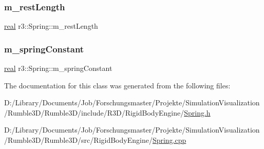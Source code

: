 \mbox{\label{classr3_1_1_spring_ad1c8ba98c782bee7f9896d0c868b9ee7}} 
\subsubsection{\texorpdfstring{m\+\_\+rest\+Length}{m\_restLength}}
{\footnotesize\ttfamily \mbox{\hyperlink{namespacer3_ab2016b3e3f743fb735afce242f0dc1eb}{real}} r3\+::\+Spring\+::m\+\_\+rest\+Length\hspace{0.3cm}{\ttfamily [protected]}}

\mbox{\label{classr3_1_1_spring_a06963e33fd2c3f8e25ddd345324b292b}} 
\subsubsection{\texorpdfstring{m\+\_\+spring\+Constant}{m\_springConstant}}
{\footnotesize\ttfamily \mbox{\hyperlink{namespacer3_ab2016b3e3f743fb735afce242f0dc1eb}{real}} r3\+::\+Spring\+::m\+\_\+spring\+Constant\hspace{0.3cm}{\ttfamily [protected]}}



The documentation for this class was generated from the following files\+:\begin{DoxyCompactItemize}
\item 
D\+:/\+Library/\+Documents/\+Job/\+Forschungsmaster/\+Projekte/\+Simulation\+Visualization/\+Rumble3\+D/\+Rumble3\+D/include/\+R3\+D/\+Rigid\+Body\+Engine/\mbox{\hyperlink{_spring_8h}{Spring.\+h}}\item 
D\+:/\+Library/\+Documents/\+Job/\+Forschungsmaster/\+Projekte/\+Simulation\+Visualization/\+Rumble3\+D/\+Rumble3\+D/src/\+Rigid\+Body\+Engine/\mbox{\hyperlink{_spring_8cpp}{Spring.\+cpp}}\end{DoxyCompactItemize}
